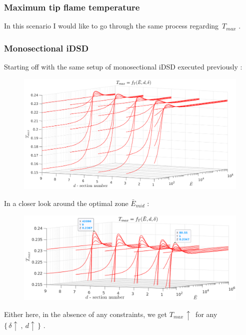 \documentclass[12pt]{article}
\numberwithin{equation}{section}
\begin{document}
\begin{flushleft}

\subsubsection{Maximum tip flame temperature}
In this scenario I would like to go through the same process regarding \,$T_{max}$ .

\subsubsection*{Monosectional iDSD}
Starting off with the same setup of monosectional iDSD executed previously :
\begin{figure}[H] 
\centering
\includegraphics[width=1.1 \linewidth, center]{T_max_full_a.png}
\end{figure}

In a closer look around the optimal zone $\bar{E}_{mid}$ :
\begin{figure}[H] 
\centering
\includegraphics[width=1.1 \linewidth, center]{T_max_full_b.png}
\end{figure}
Either here, in the absence of any constraints, we get $T_{max} \, \uparrow$\, for any $\{ \, \delta \uparrow \ , \ d \uparrow \,  \}$ .


\end{flushleft}
\end{document}
